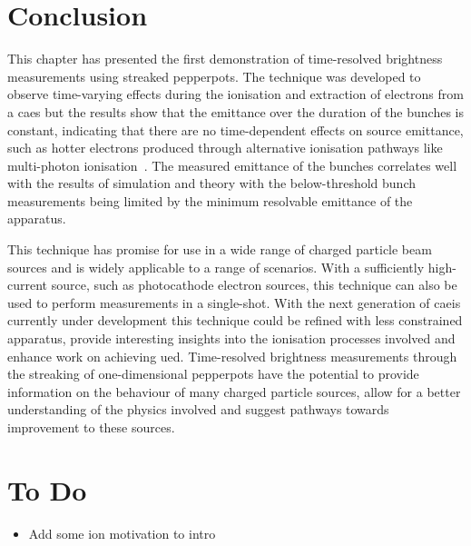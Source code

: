 \section{Conclusion}
This chapter has presented the first demonstration of time-resolved brightness measurements using streaked pepperpots.
The technique was developed to observe time-varying effects during the ionisation and extraction of electrons from a \gls{caes} but the results show that the emittance over the duration of the bunches is constant, indicating that there are no time-dependent effects on source emittance, such as hotter electrons produced through alternative ionisation pathways like multi-photon ionisation~\cite{speirs_identification_2017}.
The measured emittance of the bunches correlates well with the results of simulation and theory with the below-threshold bunch measurements being limited by the minimum resolvable emittance of the apparatus.

This technique has promise for use in a wide range of charged particle beam sources and is widely applicable to a range of scenarios.
With a sufficiently high-current source, such as photocathode electron sources, this technique can also be used to perform measurements in a single-shot.
With the next generation of \gls{caeis} currently under development this technique could be refined with less constrained apparatus, provide interesting insights into the ionisation processes involved and enhance work on achieving \gls{ued}.
Time-resolved brightness measurements through the streaking of one-dimensional pepperpots have the potential to provide information on the behaviour of many charged particle sources, allow for a better understanding of the physics involved and suggest pathways towards improvement to these sources.

{\color{red}
\section{To Do}
\begin{itemize}
    \item Add some ion motivation to intro
\end{itemize}
}
